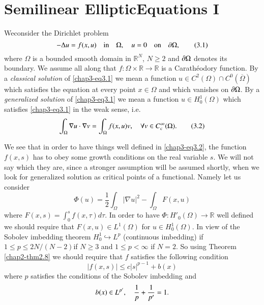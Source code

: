 \chapter[Semilinear Elliptic Equations I]{Semilinear Elliptic\hfill\break Equations I}\label{chap3}

We\pageoriginale consider the Dirichlet problem
\begin{equation*}
-\Delta u=f(x,u)\quad\text{in}\quad \Omega,\quad u=0\quad\text{on}\quad \partial
\Omega,\tag{3.1}\label{chap3-eq3.1} 
\end{equation*}
where $\Omega$ is a bounded smooth domain in $\mathbb{R}^{N}$, $N\geq
2$ and $\partial \Omega$ denotes its boundary. We assume all along that
$f:\Omega\times \mathbb{R}\to \mathbb{R}$ is a Carath\'eodory
function. By a {\em classical solution} of \eqref{chap3-eq3.1} we mean
a function $u\in C^{2}(\Omega)\cap C^{0}(\overline{\Omega})$ which
  satisfies the equation at every point $x\in \Omega$ and which
  vanishes on $\partial \Omega$. By a {\em generalized solution} of
  \eqref{chap3-eq3.1} we mean a function $u\in H^{1}_{0}(\Omega)$
  which satisfies \eqref{chap3-eq3.1} in the weak sense, i.e.
\begin{equation*}
\int_{\Omega}\nabla u\cdot \nabla v=\int_{\Omega}f(x,u)v,\quad \forall
v\in C^{\infty}_{c}(\Omega).\tag{3.2}\label{chap3-eq3.2}
\end{equation*}

We see that in order to have things well defined in
\eqref{chap3-eq3.2}, the function $f(x,s)$ has to obey some growth
conditions on the real variable $s$. We will not say which they are,
since a stronger assumption will be assumed shortly, when we look for
generalized solution as critical points of a functional. Namely let us
consider 
\begin{equation*}
\Phi(u)=\frac{1}{2}\int_{\Omega}|\nabla
u|^{2}-\int_{\Omega}F(x,u)\tag{3.3}\label{chap3-eq3.3} 
\end{equation*}
where $F(x,s)=\int^{s}_{0}f(x,\tau)d\tau$. In order to have
$\Phi:H'_{0}(\Omega)\to \mathbb{R}$ well defined we should require
that $F(x,u)\in L^{1}(\Omega)$ for $u\in H^{1}_{0}(\Omega)$. In view
of the Sobolev imbedding theorem $H^{1}_{0}\hookrightarrow L^{p}$
(continuous imbedding) if $1\leq p\leq 2N/(N-2)$\pageoriginale if
$N\geq 3$ and $1\leq p<\infty$ if $N=2$. So using Theorem
\ref{chap2-thm2.8} we should require that $f$ satisfies the following
condition 
\begin{equation*}
|f(x,s)|\leq c|s|^{p-1}+b(x)\tag{3.4}\label{chap3-eq3.4}
\end{equation*}
where $p$ satisfies the conditions of the Sobolev imbedding and
$$
b(x)\in L^{p'},\quad \frac{1}{p}+\frac{1}{p'}=1.
$$

